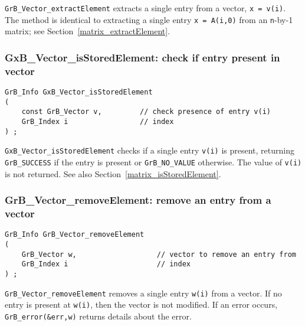 \documentclass[12pt]{article}
\begin{document}
\verb'GrB_Vector_extractElement' extracts a single entry from a vector,
\verb'x = v(i)'.  The method is identical to extracting a single entry
\verb'x = A(i,0)' from an \verb'n'-by-1 matrix; see
Section~\ref{matrix_extractElement}.

\newpage
\subsubsection{{\sf GxB\_Vector\_isStoredElement:} check if entry present in vector}
\label{vector_isStoredElement}

\begin{mdframed}[userdefinedwidth=6in]
{\footnotesize
\begin{verbatim}
GrB_Info GxB_Vector_isStoredElement
(
    const GrB_Vector v,         // check presence of entry v(i)
    GrB_Index i                 // index
) ;
\end{verbatim} } \end{mdframed}

\verb'GxB_Vector_isStoredElement' checks if a single entry \verb'v(i)'
is present, returning \verb'GrB_SUCCESS' if the entry is present or
\verb'GrB_NO_VALUE' otherwise.  The value of \verb'v(i)' is not returned.
See also Section~\ref{matrix_isStoredElement}.

\subsubsection{{\sf GrB\_Vector\_removeElement:} remove an entry from a vector}
\label{vector_removeElement}

\begin{mdframed}[userdefinedwidth=6in]
{\footnotesize
\begin{verbatim}
GrB_Info GrB_Vector_removeElement
(
    GrB_Vector w,                   // vector to remove an entry from
    GrB_Index i                     // index
) ;
\end{verbatim} } \end{mdframed}

\verb'GrB_Vector_removeElement' removes a single entry \verb'w(i)' from a vector.
If no entry is present at \verb'w(i)', then the vector is not modified.
If an error occurs, \verb'GrB_error(&err,w)' returns details about the error.
\end{document}
